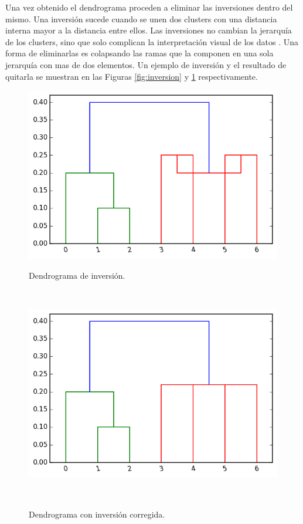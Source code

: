 \vspace{1cm}

Una vez obtenido el dendrograma proceden a eliminar las inversiones dentro del
mismo. Una inversi\'on sucede cuando se unen dos clusters con una distancia 
interna mayor a la distancia entre ellos. Las inversiones no cambian la 
jerarqu\'ia de los clusters, sino que solo complican la interpretaci\'on visual
de los datos \cite{Murtagh1985}. Una forma de eliminarlas es colapsando las 
ramas que la componen en una sola jerarqu\'ia con mas de dos elementos. Un 
ejemplo de inversi\'on y el resultado de quitarla se muestran en las Figuras 
\ref{fig:inversion} y \ref{fig:no_inversion} respectivamente. 


\begin{figure}[h!]
                                                                                                                        
\begin{minipage}[b]{0.49\textwidth}
    \includegraphics[width=\textwidth]{img/inversion_0.png}
    \caption{\small Dendrograma de inversi\'on.}
     \label{fig:inversion}
\end{minipage} ~
\hfill
\begin{minipage}[b]{0.49\textwidth}
    \includegraphics[width=\textwidth]{img/inversion_1.png}
    \caption{\small Dendrograma con inversi\'on corregida. }
    \label{fig:no_inversion}
\end{minipage} ~

\end{figure}  

